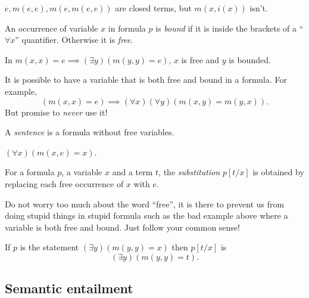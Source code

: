 \documentclass[a4paper]{article}
\begin{document}
\begin{eg}
  \(e, m(e, e), m(e, m(e, e))\) are closed terms, but \(m(x, i(x))\) isn't.
\end{eg}

\begin{definition}
  An occurrence of variable \(x\) in formula \(p\) is \emph{bound} if it is inside the brackets of a ``\(\forall x\)'' quantifier. Otherwise it is \emph{free}.
\end{definition}

\begin{eg}
  In \(m(x, x) = e \implies (\exists y) (m(y, y) = e)\), \(x\) is free and \(y\) is bounded.
\end{eg}

\begin{note}
  It is possible to have a variable that is both free and bound in a formula. For example,
  \[
    (m(x, x) = e) \implies (\forall x)(\forall y) (m(x, y) = m(y, x)).
  \]
  But promise to \emph{never} use it!
\end{note}

\begin{definition}[Sentence]
  A \emph{sentence} is a formula without free variables.
\end{definition}

\begin{eg}
  \((\forall x) (m(x, e) = x)\).
\end{eg}

\begin{definition}[Substitution]
  For a formula \(p\), a variable \(x\) and a term \(t\), the \emph{substitution} \(p[t/x]\) is obtained by replacing each free occurrence of \(x\) with \(e\).
\end{definition}

Do not worry too much about the word ``free'', it is there to prevent us from doing stupid things in stupid formula such as the bad example above where a variable is both free and bound. Just follow your common sense!

\begin{eg}
  If \(p\) is the statement \((\exists y) (m(y, y) = x)\) then \(p[t/x]\) is
  \[
    (\exists y) (m(y, y) = t).
  \]
\end{eg}

\subsection{Semantic entailment}
\end{document}
